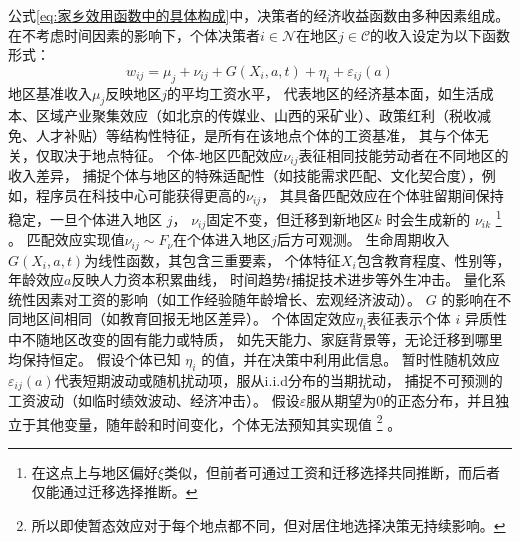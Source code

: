 \documentclass[
  a4paper,
  zihao=-4,
  fontset=mac,
  AutoFakeBold,
  AutoFakeSlant,
  oneside]{ctexbook}
\let\oldfootnote\footnote
\renewcommand{\footnote}[1]{%
  \oldfootnote{\setstretch{1.5}#1}%
}
\begin{document}
公式\ref{eq:家乡效用函数中的具体构成}中，决策者的经济收益函数由多种因素组成。在不考虑时间因素的影响下，个体决策者$i \in \mathcal{N}$在地区$j \in \mathcal{C}$的收入设定为以下函数形式：
\begin{equation}
  w_{ij}=\mu_j + \nu_{ij} + G(X_i,a,t) + \eta_i + \varepsilon_{ij}(a)
  \label{eq:经济收益函数}
\end{equation}
地区基准收入$\mu_j$反映地区$j$的平均工资水平，
代表地区的经济基本面，如生活成本、区域产业聚集效应（如北京的传媒业、山西的采矿业）、政策红利（税收减免、人才补贴）等结构性特征，是所有在该地点个体的工资基准，
其与个体无关，仅取决于地点特征。
个体-地区匹配效应$\nu_{ij}$表征相同技能劳动者在不同地区的收入差异，
捕捉个体与地区的特殊适配性（如技能需求匹配、文化契合度），例如，程序员在科技中心可能获得更高的$\nu_{ij}$，
其具备匹配效应在个体驻留期间保持稳定，一旦个体进入地区 $j$，
$\nu_{ij}$固定不变，但迁移到新地区$k$ 时会生成新的 $\nu_{ik}$\footnote{在这点上与地区偏好$\xi$类似，但前者可通过工资和迁移选择共同推断，而后者仅能通过迁移选择推断。}。
匹配效应实现值$\nu_{ij} \sim F_\nu$在个体进入地区$j$后方可观测。
生命周期收入$G(X_i,a,t)$为线性函数，其包含三重要素，
个体特征$X_i$包含教育程度、性别等，
年龄效应$a$反映人力资本积累曲线，
时间趋势$t$捕捉技术进步等外生冲击。
量化系统性因素对工资的影响（如工作经验随年龄增长、宏观经济波动）。
$G$ 的影响在不同地区间相同（如教育回报无地区差异）。
个体固定效应$\eta_i$表征表示个体 $i$ 异质性中不随地区改变的固有能力或特质，
如先天能力、家庭背景等，无论迁移到哪里均保持恒定。
假设个体已知 $\eta_i$ 的值，并在决策中利用此信息。
暂时性随机效应$\varepsilon_{ij}(a)$代表短期波动或随机扰动项，服从i.i.d分布的当期扰动，
捕捉不可预测的工资波动（如临时绩效波动、经济冲击）。
假设$\varepsilon$服从期望为0的正态分布，并且独立于其他变量，随年龄和时间变化，个体无法预知其实现值\footnote{所以即使暂态效应对于每个地点都不同，但对居住地选择决策无持续影响。}。
\end{document}

